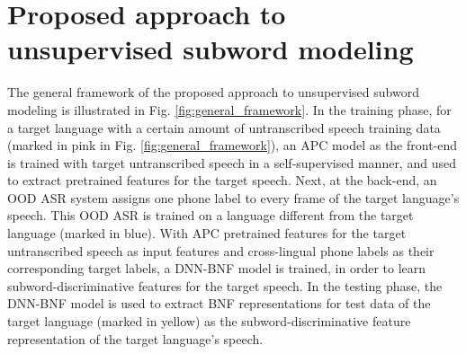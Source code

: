 \documentclass[transmag]{IEEEtran}
\begin{document}

 





\section{Proposed approach to unsupervised subword modeling}
\label{sec:usm_approach}

The general framework of the proposed approach to unsupervised subword modeling is illustrated in Fig. \ref{fig:general_framework}. In the training phase, for a target language with a certain amount of untranscribed speech training data (marked in pink in Fig. \ref{fig:general_framework}), 
an APC model as the front-end is trained with target  untranscribed speech in a self-supervised manner, and used to extract pretrained features for the target speech. 
Next, at the back-end, an OOD ASR system assigns one phone label to every frame of the target language’s speech. This OOD ASR is trained on a language different from the target language (marked in blue). With APC pretrained features for the target untranscribed speech as input features and cross-lingual phone labels as their corresponding target labels, a DNN-BNF model is trained, in order to learn subword-discriminative features for the target speech. In the testing phase, the DNN-BNF model is used to extract BNF representations for test data of the target language (marked in yellow) as the subword-discriminative feature representation of the target language’s speech.  
\end{document}
